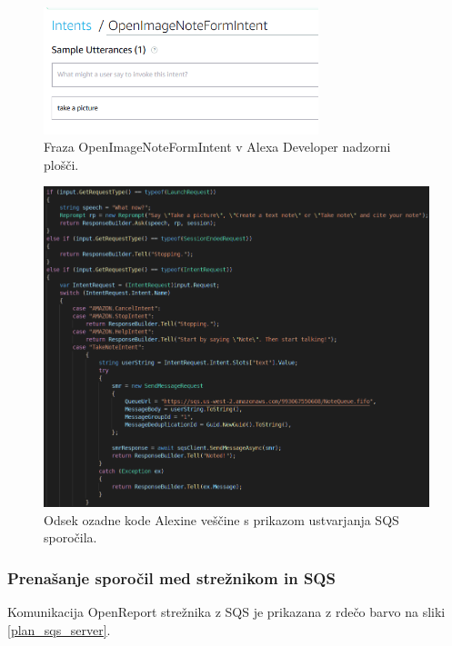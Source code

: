 \documentclass[a4paper, 12pt]{book}
\begin{document}
\begin{figure}[H]
\begin{center}
\includegraphics[width=8cm]{intent_image}
\end{center}
\caption{Fraza OpenImageNoteFormIntent v Alexa Developer nadzorni plošči.}
\label{OpenImageNoteFormIntent}
\end{figure}

\begin{figure}[H]
\begin{center}
\includegraphics[width=13.5cm]{skill_code}
\end{center}
\caption{Odsek ozadne kode Alexine veščine s prikazom ustvarjanja SQS sporočila.}
\label{skill_code}
\end{figure}

\subsubsection{Prenašanje sporočil med strežnikom in SQS}

Komunikacija OpenReport strežnika z SQS je prikazana z rdečo barvo na sliki \ref{plan_sqs_server}.
\end{document}
